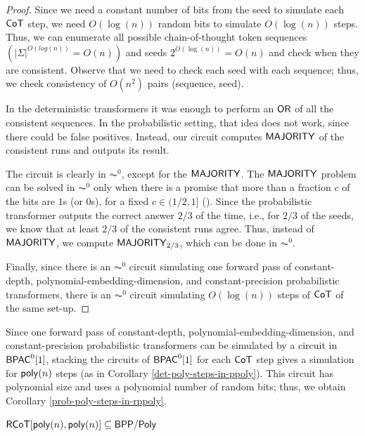 \begin{proof}
    Since we need a constant number of bits from the seed to simulate each $\mathsf{CoT}$ step, we need $O(\log(n))$ random bits to simulate $O(\log(n))$ steps.
    Thus, we can enumerate all possible chain-of-thought token sequences $(|\Sigma|^{O(log(n))} = O(n))$ and seeds $2^{O(\log(n))} = O(n)$ and check when they are consistent.
    Observe that we need to check each seed with each sequence; thus, we check consistency of $O(n^2)$ pairs (sequence, seed).
    
    In the deterministic transformers it was enough to perform an $\mathsf{OR}$ of all the consistent sequences.
    In the probabilistic setting, that idea does not work, since there could be false positives.
    Instead, our circuit computes $\mathsf{MAJORITY}$ of the consistent runs and outputs its result.

    The circuit is clearly in $\AC^0$, except for the $\mathsf{MAJORITY}$.
    The $\mathsf{MAJORITY}$ problem can be solved in $\AC^0$ only when there is a promise that more than a fraction $c$ of the bits are $1$s (or $0$s), for a fixed $c \in (1/2, 1]$ (\citet{viola2009approximate}).
    Since the probabilistic transformer outputs the correct answer $2/3$ of the time, i.e., for $2/3$ of the seeds, we know that at least $2/3$ of the consistent runs agree.
    Thus, instead of $\mathsf{MAJORITY}$, we compute $\mathsf{MAJORITY}_{2/3}$, which can be done in $\AC^0$.

    Finally, since there is an $\AC^0$ circuit simulating one forward pass of constant-depth, polynomial-embedding-dimension, and constant-precision probabilistic transformers, there is an $\AC^0$ circuit simulating $O(\log(n))$ steps of $\mathsf{CoT}$ of the same set-up.
\end{proof}


\bigskip

Since one forward pass of constant-depth, polynomial-embedding-dimension, and constant-precision probabilistic transformers can be simulated by a circuit in $\mathsf{BPAC}^0[1]$, stacking the circuits of $\mathsf{BPAC}^0[1]$ for each $\mathsf{CoT}$ step gives a simulation for $\mathsf{poly}(n)$ steps (as in Corollary \ref{det-poly-steps-in-ppoly}).
This circuit has polynomial size and uses a polynomial number of random bits; thus, we obtain Corollary \ref{prob-poly-steps-in-rppoly}.


\begin{corollary}\label{prob-poly-steps-in-rppoly}
    $\mathsf{RCoT}[\mathsf{poly}(n), \mathsf{poly}(n)] \subseteq \mathsf{BPP/Poly}$ 
\end{corollary}

